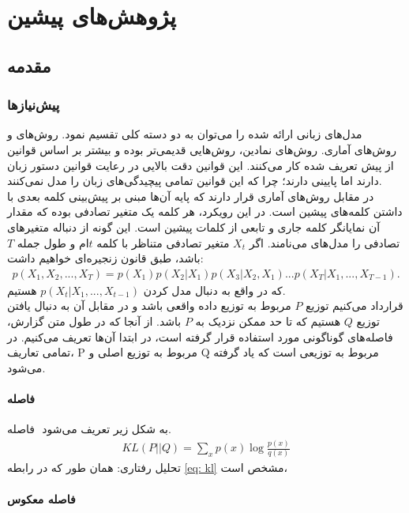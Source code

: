 \chapter{پژوهش‌های پیشین}\label{Chap:Chap2}
\minitoc

\section{مقدمه}\label{intro}

\subsection{پیش‌نیازها}
مدل‌های زبانی ارائه شده را می‌توان به دو دسته کلی تقسیم نمود. روش‌های  و روش‌های آماری. روش‌های نمادین، روش‌هایی قدیمی‌تر بوده و بیشتر بر اساس قوانین از پیش تعریف شده کار می‌کنند. این قوانین دقت بالایی در رعایت قوانین دستور زبان دارند اما  پایینی دارند؛ چرا که این قوانین تمامی پیچیدگی‌های زبان را مدل نمی‌کنند.\\
در مقابل روش‌های آماری قرار دارند که پایه آن‌ها مبنی بر پیش‌بینی کلمه بعدی با داشتن کلمه‌های پیشین است. در این رویکرد، هر کلمه یک متغیر تصادفی بوده که مقدار آن نمایانگر کلمه جاری و تابعی از کلمات پیشین است. این گونه از دنباله متغیر‌های تصادفی را مدل‌های  می‌نامند. اگر $X_t$ متغیر تصادفی متناظر با کلمه $t$ام و طول جمله $T$ باشد، طبق قانون زنجیره‌ای خواهیم داشت:
\begin{equation}\begin{split}
		p(X_1, X_2, ... , X_T) = p(X_1) p(X_2|X_1) p(X_3|X_2, X_1) ... p(X_T|X_1, ..., X_{T-1}).
	\end{split}\end{equation}
که در واقع به دنبال مدل کردن $p(X_t|X_1, ..., X_{t-1 })$ هستیم. \\
قرارداد می‌کنیم توزیع $P$ مربوط به توزیع داده واقعی باشد و در مقابل آن به دنبال یافتن توزیع $Q$ هستیم که تا حد ممکن نزدیک به $P$ باشد.
از آنجا که در طول متن گزارش، فاصله‌های گوناگونی مورد استفاده قرار گرفته است، در ابتدا آن‌ها تعریف می‌کنیم. در تمامی تعاریف، P مربوط به توزیع اصلی و Q مربوط به توزیعی است که یاد گرفته می‌شود.

\subsubsection{فاصله  }
فاصله ‎ به شکل زیر تعریف می‌شود.
\begin{gather} \label{eq: kl}
	KL (P || Q)   = \sum_x p(x) \log \frac{p(x)}{q(x)}
\end{gather}
تحلیل رفتاری:
همان طور که در رابطه ‎\ref{eq: kl}‎ مشخص است،
‎\subsubsection{فاصله  معکوس}
